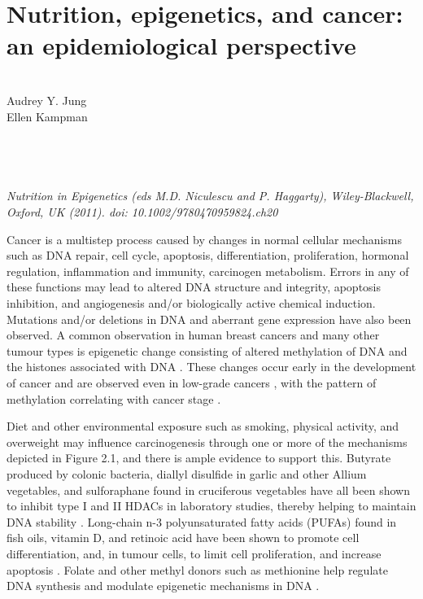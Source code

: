 \chapter{Nutrition, epigenetics, and cancer: \\ an epidemiological perspective} 
\label{chap2_Nutritionepigeneticscancer: an epidemiologicalperspective} 
 
\quad\\ 
 
\noindent 
Audrey Y. Jung\\ 
Ellen Kampman\\ 
 
\quad\\ 
 
\quad\\ 
 
\quad\\ 
 
\quad\\ 
 
\noindent \emph{Nutrition in Epigenetics (eds M.D. Niculescu and P. Haggarty), Wiley-Blackwell, Oxford, UK (2011). doi: 10.1002/9780470959824.ch20} 
 
\newpage 
 
\noindent Cancer is a multistep process caused by changes in normal cellular mechanisms such as DNA repair, cell cycle, apoptosis, differentiation, proliferation, hormonal regulation, inflammation and immunity, carcinogen metabolism. Errors in any of these functions may lead to altered DNA structure and integrity, apoptosis inhibition, and angiogenesis and/or biologically active chemical induction. Mutations and/or deletions in DNA and aberrant gene expression have also been observed. A common observation in human breast cancers and many other tumour types is epigenetic change consisting of altered methylation of DNA \cite{c21,c25} and the histones associated with DNA \cite{c26,c28}. These changes occur early in the development of cancer and are observed even in low-grade cancers \cite{c29}, with the pattern of methylation correlating with cancer stage \cite{c210}. 
 
\noindent Diet and other environmental exposure such as smoking, physical activity, and overweight may influence carcinogenesis through one or more of the mechanisms depicted in Figure 2.1, and there is ample evidence to support this. Butyrate produced by colonic bacteria, diallyl disulfide in garlic and other Allium vegetables, and sulforaphane found in cruciferous vegetables have all been shown to inhibit type I and II HDACs in laboratory studies, thereby helping to maintain DNA stability \cite{c211}. Long-chain n-3 polyunsaturated fatty acids (PUFAs) found in fish oils, vitamin D, and retinoic acid have been shown to promote cell differentiation, and, in tumour cells, to limit cell proliferation, and increase apoptosis \cite{c212,c214}. Folate and other methyl donors such as methionine help regulate DNA synthesis and modulate epigenetic mechanisms in DNA \cite{c214}. 
 
